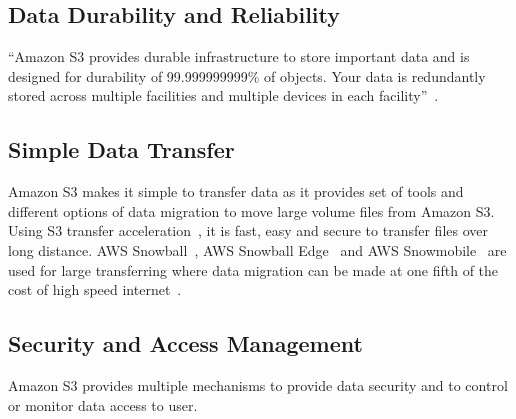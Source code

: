 \subsection{Data Durability and Reliability} 

``Amazon S3 provides durable infrastructure to store important data and is
designed for durability of 99.999999999\% of objects. Your data is redundantly
stored across multiple facilities and multiple devices in each
facility''~\cite{hid-sp18-420-amazon-S3}.

\subsection{Simple Data Transfer} 

Amazon S3 makes it simple to transfer data as it provides set of tools and
different options of data migration to move large volume files from Amazon S3.
Using S3 transfer acceleration~\cite{hid-sp18-420-amazon-S3-dataTransfer-FAQ},
it is fast, easy and secure to transfer files over long distance. AWS
Snowball~\cite{hid-sp18-420-amazon-snowball}, AWS Snowball
Edge~\cite{hid-sp18-420-amazon-snowball-edge} and AWS
Snowmobile~\cite{hid-sp18-420-amazon-snowmobile} are used for large transferring
where data migration can be made at one fifth of the cost of high speed
internet~\cite{hid-sp18-420-amazon-S3-cloud-migration}.

\subsection{Security and Access Management} 

Amazon S3 provides multiple mechanisms to provide data security and to control
or monitor data access to user.


